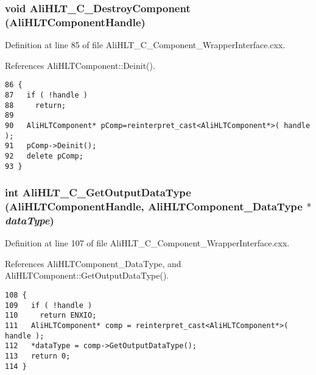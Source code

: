 \subsubsection{\setlength{\rightskip}{0pt plus 5cm}void Ali\-HLT\_\-C\_\-Destroy\-Component ({\bf Ali\-HLTComponent\-Handle})}\label{group__alihlt__wrapper__interface_ga7}




Definition at line 85 of file Ali\-HLT\_\-C\_\-Component\_\-Wrapper\-Interface.cxx.

References Ali\-HLTComponent::Deinit().

\footnotesize\begin{verbatim}86 {
87   if ( !handle )
88     return;
89   
90   AliHLTComponent* pComp=reinterpret_cast<AliHLTComponent*>( handle );
91   pComp->Deinit();
92   delete pComp;
93 }
\end{verbatim}\normalsize 


\subsubsection{\setlength{\rightskip}{0pt plus 5cm}int Ali\-HLT\_\-C\_\-Get\-Output\-Data\-Type ({\bf Ali\-HLTComponent\-Handle}, {\bf Ali\-HLTComponent\_\-Data\-Type} $\ast$ {\em data\-Type})}\label{group__alihlt__wrapper__interface_ga9}




Definition at line 107 of file Ali\-HLT\_\-C\_\-Component\_\-Wrapper\-Interface.cxx.

References Ali\-HLTComponent\_\-Data\-Type, and Ali\-HLTComponent::Get\-Output\-Data\-Type().

\footnotesize\begin{verbatim}108 {
109   if ( !handle )
110     return ENXIO;
111   AliHLTComponent* comp = reinterpret_cast<AliHLTComponent*>( handle );
112   *dataType = comp->GetOutputDataType();
113   return 0;
114 }
\end{verbatim}\normalsize 


